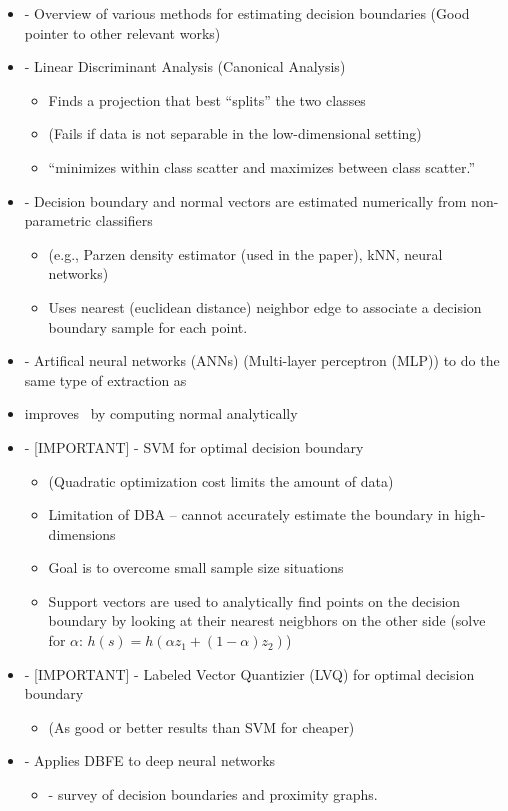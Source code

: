 \documentclass[12pt]{article}
\begin{document}
\begin{itemize}
	\item \cite{DiamantiniPotena2007} - Overview of various methods for
	estimating decision boundaries (Good pointer to other relevant works)
	\item  \cite{Fukunaga1990,ParkParkPardalos2004} - Linear Discriminant
	Analysis (Canonical Analysis)
	\begin{itemize}
		\item Finds a projection that best ``splits'' the two classes
		\item (Fails if data is not separable in the low-dimensional setting)
		\item ``minimizes within class scatter and maximizes between class
		scatter.''
	\end{itemize}
	\item \cite{LeeLandgrebe1993} - Decision boundary and normal vectors are
	estimated numerically from non-parametric classifiers
	\begin{itemize}
		\item  (e.g., Parzen density estimator (used in the paper), kNN, neural
		networks)
		\item Uses nearest (euclidean distance) neighbor edge to associate a
		decision boundary sample for each point.
	\end{itemize}
	\item \cite{LeeLandgrebe1997} - Artifical neural networks (ANNs)
	(Multi-layer perceptron (MLP)) to do the same type of extraction
	as~\cite{LeeLandgrebe1993}
	\item \cite{GoLee2003} improves~\cite{LeeLandgrebe1997} by computing normal
	analytically
	\item \cite{ZhangLiu2005} - [IMPORTANT] - SVM for optimal decision boundary
	\begin{itemize}
		\item (Quadratic optimization cost limits the amount of data)
		\item Limitation of DBA -- cannot accurately estimate the boundary in
		high-dimensions
		\item Goal is to overcome small sample size situations
		\item Support vectors are used to analytically find points on the
		decision boundary by looking at their nearest neigbhors on the other
		side (solve for $\alpha$: $h(s) = h(\alpha z_1 + (1 - \alpha) z_2)$)
	\end{itemize}
	\item \cite{DiamantiniPotena2006} - [IMPORTANT] - Labeled Vector Quantizier
	(LVQ) for optimal decision boundary 
	\begin{itemize}
		\item (As good or better results than SVM for cheaper) 
	\end{itemize}
	\item \cite{WooLee2017} - Applies DBFE to deep neural networks
	\begin{itemize}
		\item \cite{Toussaint2005} - survey of decision boundaries and proximity graphs.
	\end{itemize}
\end{itemize}
\end{document}
